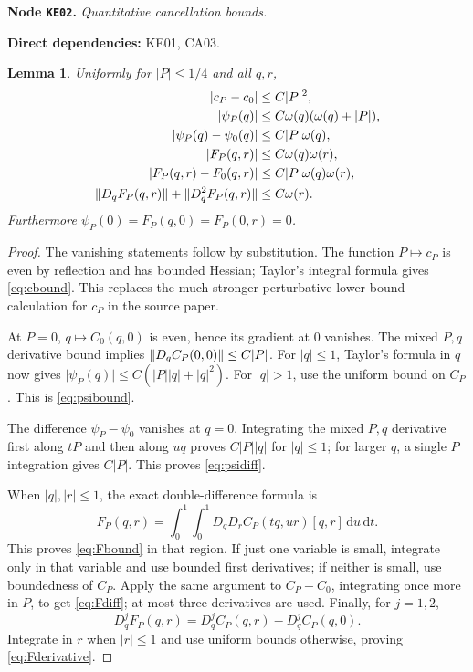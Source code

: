 \documentclass[11pt,a4paper]{article}
\newtheorem{lemma}[theorem]{Lemma}
\theoremstyle{remark}\newtheorem{remark}[theorem]{Remark}
\newcommand{\abs}[1]{\lvert #1\rvert}\newcommand{\rankone}[2]{\lvert #1\rangle\langle #2\rvert}
\newcommand{\dd}{\,\mathrm d}\newcommand{\almosteverywhere}{\text{a.e.}}
\newcommand{\node}[3]{\par\Needspace{6\baselineskip}\smallskip\hypertarget{node:#1}{}\label{nodepage:#1}\noindent\textbf{Node \texttt{#1}.} \textit{#2.}\par\noindent\textbf{Direct dependencies:} #3.\par}
\begin{document}
\node{KE02}{Quantitative cancellation bounds}{KE01, CA03}
\begin{lemma}\label{lem:kernelbounds}
Uniformly for $\abs P\leq1/4$ and all $q,r$,
\begin{align}
 \abs{c_P-c_0}&\leq C\abs P^2,\label{eq:cbound}\\
 \abs{\psi_P(q)}&\leq C\omega(q)(\omega(q)+\abs P),\label{eq:psibound}\\
 \abs{\psi_P(q)-\psi_0(q)}&\leq C\abs P\omega(q),\label{eq:psidiff}\\
 \abs{F_P(q,r)}&\leq C\omega(q)\omega(r),\label{eq:Fbound}\\
 \abs{F_P(q,r)-F_0(q,r)}&\leq C\abs P\omega(q)\omega(r),\label{eq:Fdiff}\\
 \norm{D_qF_P(q,r)}+\norm{D_q^2F_P(q,r)}&\leq C\omega(r).\label{eq:Fderivative}
\end{align}
Furthermore $\psi_P(0)=F_P(q,0)=F_P(0,r)=0$.
\end{lemma}
\begin{proof}
The vanishing statements follow by substitution. The function $P\mapsto c_P$ is even by reflection and has bounded Hessian; Taylor's integral formula gives \eqref{eq:cbound}. This replaces the much stronger perturbative lower-bound calculation for $c_P$ in the source paper.

At $P=0$, $q\mapsto C_0(q,0)$ is even, hence its gradient at $0$ vanishes. The mixed $P,q$ derivative bound implies $\norm{D_qC_P(0,0)}\leq C\abs P$. For $\abs q\leq1$, Taylor's formula in $q$ now gives $\abs{\psi_P(q)}\leq C(\abs P\abs q+\abs q^2)$. For $\abs q>1$, use the uniform bound on $C_P$. This is \eqref{eq:psibound}.

The difference $\psi_P-\psi_0$ vanishes at $q=0$. Integrating the mixed $P,q$ derivative first along $tP$ and then along $uq$ proves $C\abs P\abs q$ for $\abs q\leq1$; for larger $q$, a single $P$ integration gives $C\abs P$. This proves \eqref{eq:psidiff}.

When $\abs q,\abs r\leq1$, the exact double-difference formula is
\[
 F_P(q,r)=\int_0^1\int_0^1D_qD_rC_P(tq,ur)[q,r]\dd u\dd t.
\]
This proves \eqref{eq:Fbound} in that region. If just one variable is small, integrate only in that variable and use bounded first derivatives; if neither is small, use boundedness of $C_P$. Apply the same argument to $C_P-C_0$, integrating once more in $P$, to get \eqref{eq:Fdiff}; at most three derivatives are used. Finally, for $j=1,2$,
\[
 D_q^jF_P(q,r)=D_q^jC_P(q,r)-D_q^jC_P(q,0).
\]
Integrate in $r$ when $\abs r\leq1$ and use uniform bounds otherwise, proving \eqref{eq:Fderivative}.
\end{proof}
\end{document}
